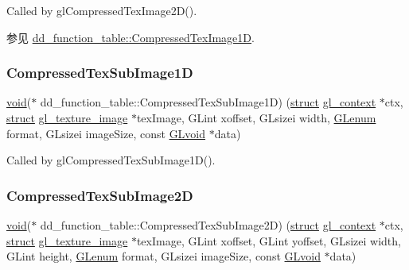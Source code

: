 Called by gl\+Compressed\+Tex\+Image2\+D().

\begin{DoxySeeAlso}{参见}
\hyperlink{structdd__function__table_a3c38c3f19f2f4702cd4f239bbc29f012}{dd\+\_\+function\+\_\+table\+::\+Compressed\+Tex\+Image1D}. 
\end{DoxySeeAlso}
\mbox{\label{structdd__function__table_a374e6d241342f182142b6a9d19e2f9ac}} 
\subsubsection{\texorpdfstring{Compressed\+Tex\+Sub\+Image1D}{CompressedTexSubImage1D}}
{\footnotesize\ttfamily \hyperlink{interfacevoid}{void}($\ast$ dd\+\_\+function\+\_\+table\+::\+Compressed\+Tex\+Sub\+Image1D) (\hyperlink{interfacestruct}{struct} \hyperlink{structgl__context}{gl\+\_\+context} $\ast$ctx, \hyperlink{interfacestruct}{struct} \hyperlink{structgl__texture__image}{gl\+\_\+texture\+\_\+image} $\ast$tex\+Image, G\+Lint xoffset, G\+Lsizei width, \hyperlink{interfacevoid}{G\+Lenum} format, G\+Lsizei image\+Size, const \hyperlink{interfacevoid}{G\+Lvoid} $\ast$data)}

Called by gl\+Compressed\+Tex\+Sub\+Image1\+D(). \mbox{\label{structdd__function__table_a3f6e668531dd8aab592942e3ec6b3ce3}} 
\subsubsection{\texorpdfstring{Compressed\+Tex\+Sub\+Image2D}{CompressedTexSubImage2D}}
{\footnotesize\ttfamily \hyperlink{interfacevoid}{void}($\ast$ dd\+\_\+function\+\_\+table\+::\+Compressed\+Tex\+Sub\+Image2D) (\hyperlink{interfacestruct}{struct} \hyperlink{structgl__context}{gl\+\_\+context} $\ast$ctx, \hyperlink{interfacestruct}{struct} \hyperlink{structgl__texture__image}{gl\+\_\+texture\+\_\+image} $\ast$tex\+Image, G\+Lint xoffset, G\+Lint yoffset, G\+Lsizei width, G\+Lint height, \hyperlink{interfacevoid}{G\+Lenum} format, G\+Lsizei image\+Size, const \hyperlink{interfacevoid}{G\+Lvoid} $\ast$data)}

